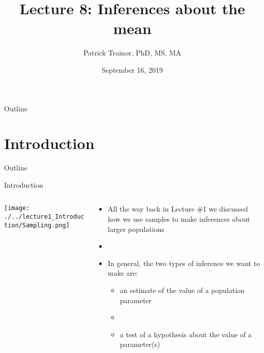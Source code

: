 \documentclass[xcolor=dvipsnames]{beamer}
\title[Lecture 8]{Lecture 8: Inferences about the mean}
\author[Patrick Trainor]{Patrick Trainor, PhD, MS, MA}
\institute[NMSU]{New Mexico State University}
\date{September 16, 2019}
\begin{document}
\begin{frame}
	\maketitle
\end{frame}

\begin{frame}{Outline}
	\tableofcontents[hideallsubsections]
\end{frame}

\section{Introduction}
\begin{frame}{Outline}
	\tableofcontents[currentsection,subsectionstyle=show/shaded/hide]
\end{frame}

\begin{frame}{Introduction}
	\begin{columns}
		\begin{column}{.4 \textwidth}
			\begin{center}
				\texttt{[image: ./../lecture1\_Introduction/Sampling.png]}
				\end{center}
		\end{column}
		\begin{column}{.5 \textwidth}
				\begin{itemize}
				\item All the way back in Lecture \#1 we discussed how we use samples to make inferences about larger populations \pause
				\item[]
				\item In general, the two types of inference we want to make are: \pause
				\begin{itemize}
					\item an estimate of the value of a population parameter \pause
					\item[]
					\item a test of a hypothesis about the value of a parameter(s)
				\end{itemize}
			\end{itemize}
		\end{column}
	\end{columns}
\end{frame}
\end{document}
